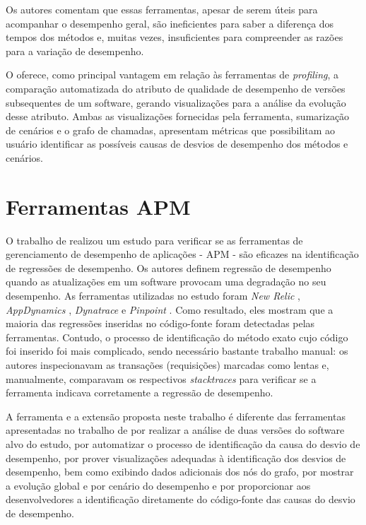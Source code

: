 Os autores comentam que essas ferramentas, apesar de serem úteis para acompanhar o desempenho geral, são ineficientes para saber a diferença dos tempos dos métodos e, muitas vezes, insuficientes para compreender as razões para a variação de desempenho.

O {\textit{\toolName}} oferece, como principal vantagem em relação às ferramentas de \textit{profiling}, a comparação automatizada do atributo de qualidade de desempenho de versões subsequentes de um software, gerando visualizações para a análise da evolução desse atributo. Ambas as visualizações fornecidas pela ferramenta, sumarização de cenários e o grafo de chamadas, apresentam métricas que possibilitam ao usuário identificar as possíveis causas de desvios de desempenho dos métodos e cenários.

\section{Ferramentas APM} \label{sec:trabalhos-relacionados-ferramentas-apm}

O trabalho de \citeauthor{Ahmed2016} realizou um estudo para verificar se as ferramentas de gerenciamento de desempenho de aplicações - APM - são eficazes na identificação de regressões de desempenho. Os autores definem regressão de desempenho quando as atualizações em um software provocam uma degradação no seu desempenho. As ferramentas utilizadas no estudo foram \textit{New Relic} \cite{Relic2016}, \textit{AppDynamics} \cite{Appdynamics}, \textit{Dynatrace} \cite{Dynatrace2016} e \textit{Pinpoint} \cite{Pinpoint2016}. Como resultado, eles mostram que a maioria das regressões inseridas no código-fonte foram detectadas pelas ferramentas. Contudo, o processo de identificação do método exato cujo código foi inserido foi mais complicado, sendo necessário bastante trabalho manual: os autores inspecionavam as transações (requisições) marcadas como lentas e, manualmente, comparavam os respectivos \textit{stacktraces} para verificar se a ferramenta indicava corretamente a regressão de desempenho.

A ferramenta e a extensão proposta neste trabalho é diferente das ferramentas apresentadas no trabalho de \citeauthor{Ahmed2016} por realizar a análise de duas versões do software alvo do estudo, por automatizar o processo de identificação da causa do desvio de desempenho, por prover visualizações adequadas à identificação dos desvios de desempenho, bem como exibindo dados adicionais dos nós do grafo, por mostrar a evolução global e por cenário do desempenho e por proporcionar aos desenvolvedores a identificação diretamente do código-fonte das causas do desvio de desempenho.

